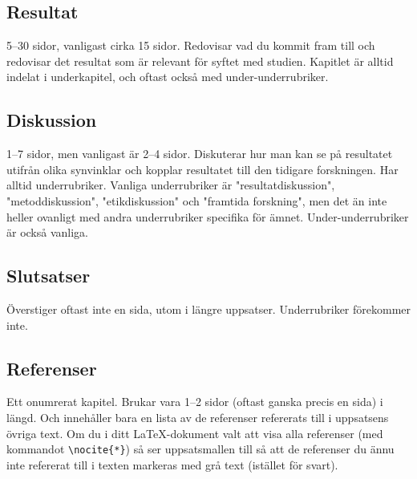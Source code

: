\subsection{Resultat}
\label{rubrik.resultat}

5--30 sidor, vanligast cirka 15 sidor. Redovisar vad du kommit fram till och
redovisar det resultat som är relevant för syftet med studien. Kapitlet är
alltid indelat i underkapitel, och oftast också med under-underrubriker.


\subsection{Diskussion}
\label{rubrik.diskussion}

1--7 sidor, men vanligast är 2--4 sidor. Diskuterar hur man kan se på
resultatet utifrån olika synvinklar och kopplar resultatet till den tidigare
forskningen. Har alltid underrubriker. Vanliga underrubriker är
"resultatdiskussion", "metoddiskussion", "etikdiskussion" och "framtida
forskning", men det än inte heller ovanligt med andra underrubriker specifika
för ämnet. Under-underrubriker är också vanliga.


\subsection{Slutsatser}
\label{rubrik.slutsats}

Överstiger oftast inte en sida, utom i längre uppsatser. Underrubriker
förekommer inte.


\subsection{Referenser}
\label{rubrik.referenser}

Ett onumrerat kapitel. Brukar vara 1--2 sidor (oftast ganska precis en sida) i
längd. Och innehåller bara en lista av de referenser refererats till i
uppsatsens övriga text. Om du i ditt \LaTeX{}-dokument valt att visa alla
referenser (med kommandot \verb|\nocite{*}|) så ser uppsatsmallen till så att
de referenser du ännu inte refererat till i texten markeras med grå text
(istället för svart).

